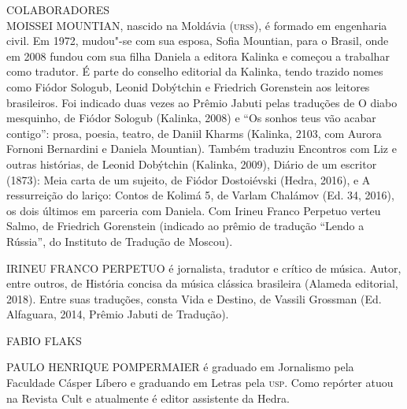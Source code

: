 \pagebreak

\noindent{}COLABORADORES\\

\noindent{}MOISSEI MOUNTIAN, nascido na Moldávia (\textsc{urss}), é formado em engenharia civil. Em 1972, mudou"-se com sua esposa, Sofia Mountian, para o Brasil,
onde em 2008 fundou com sua filha Daniela a editora Kalinka e começou a
trabalhar como tradutor. É parte do conselho editorial da Kalinka, tendo
trazido nomes como Fiódor Sologub, Leonid Dobýtchin e Friedrich
Gorenstein aos leitores brasileiros. Foi indicado duas vezes ao Prêmio
Jabuti pelas traduções de {\textltit O diabo mesquinho}, de Fiódor Sologub
(Kalinka, 2008) e {\textltit “Os sonhos teus vão acabar contigo”: prosa,
poesia, teatro}, de Daniil Kharms (Kalinka, 2103, com Aurora Fornoni
Bernardini e Daniela Mountian). Também traduziu {\textltit Encontros com Liz
e outras histórias}, de Leonid Dobýtchin (Kalinka, 2009), {\textltit Diário
de um escritor (1873): Meia carta de um sujeito}, de Fiódor Dostoiévski
(Hedra, 2016), e {\textltit A ressurreição do lariço: Contos de Kolimá 5}, de
Varlam Chalámov (Ed. 34, 2016), os dois últimos em parceria com Daniela.
Com Irineu Franco Perpetuo verteu {\textltit Salmo}, de Friedrich Gorenstein
(indicado ao prêmio de tradução “Lendo a Rússia”, do Instituto de
Tradução de Moscou).

\medskip

\noindent{}IRINEU FRANCO PERPETUO é jornalista, tradutor e crítico de música. Autor, entre outros, de {\textltit História concisa da música clássica brasileira} (Alameda editorial, 2018). Entre suas traduções, consta {\textltit Vida e Destino}, de Vassili Grossman (Ed. Alfaguara, 2014, Prêmio Jabuti de Tradução).

\medskip

\noindent{}FABIO FLAKS \lipsum[12]

\medskip

\noindent{}PAULO HENRIQUE POMPERMAIER é graduado em Jornalismo pela Faculdade Cásper Líbero e graduando em Letras pela \textsc{usp}. Como repórter atuou na Revista {\textltit Cult} e atualmente é editor assistente da Hedra.

\afterpage{\blankpage}

\newpage
\pagestyle{empty}

